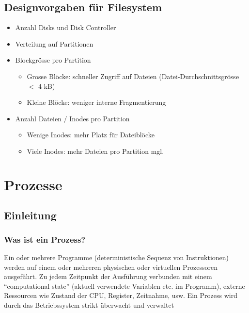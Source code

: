 \documentclass[a4paper, 10pt]{article}
\begin{document}
\subsection{Designvorgaben f\"ur Filesystem}
\begin{itemize}
\item Anzahl Disks und Disk Controller
\item Verteilung auf Partitionen
\item Blockgr\"osse pro Partition
\begin{itemize}
\item Grosse Bl\"ocke: schneller Zugriff auf Dateien (Datei-Durchschnittsgr\"osse $<$ 4 kB)
\item Kleine Bl\"ocke: weniger interne Fragmentierung
\end{itemize}
\item Anzahl Dateien / Inodes pro Partition
\begin{itemize}
\item Wenige Inodes: mehr Platz f\"ur Dateibl\"ocke
\item Viele Inodes: mehr Dateien pro Partition mgl.
\end{itemize}
\end{itemize}

\newpage
\section{Prozesse}

\subsection{Einleitung}

\subsubsection{Was ist ein Prozess?}
Ein oder mehrere Programme (deterministische Sequenz von Instruktionen) werden auf einem oder mehreren physischen oder virtuellen Prozessoren ausgeführt. Zu jedem Zeitpunkt der Ausführung verbunden mit einem “computational state” (aktuell verwendete Variablen etc. im Programm), externe Ressourcen wie Zustand der CPU, Register, Zeitnahme, usw. Ein Prozess wird durch das Betriebssystem strikt überwacht und verwaltet
\end{document}
